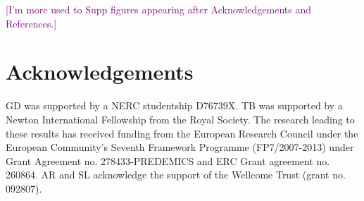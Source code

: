 \documentclass[11pt,oneside,letterpaper]{article}
\def\tbc#1{\textcolor{purple}{[#1]}}
\begin{document}


\tbc{I'm more used to Supp figures appearing after Acknowledgements and References.}

\section*{Acknowledgements}
GD was supported by a NERC studentship D76739X.
TB was supported by a Newton International Fellowship from the Royal Society. 
The research leading to these results has received funding from the European Research Council under the European Community's Seventh Framework Programme (FP7/2007-2013) under Grant Agreement no. 278433-PREDEMICS and ERC Grant agreement no. 260864.
AR and SL acknowledge the support of the Wellcome Trust (grant no. 092807).



\end{document}
